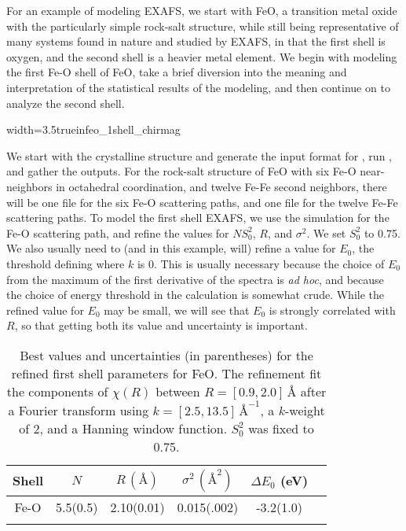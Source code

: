 For an example of modeling EXAFS, we start with FeO, a transition metal
oxide with the particularly simple rock-salt structure, while still being
representative of many systems found in nature and studied by EXAFS, in
that the first shell is oxygen, and the second shell is a heavier metal
element.  We begin with modeling the first Fe-O shell of FeO, take a brief
diversion into  the meaning and interpretation of the statistical results
of the modeling, and then continue on to analyze the second shell.

\begin{Nfig}{width=3.5truein}{feo_1shell_chirmag}
  \caption{First shell fit to the EXAFS of FeO, showing the magnitude of
    the Fourier transform of the EXAFS,  $|\chi(R)|$, for data (blue) and
    best fit model (red).}
  \label{Fig:FIT:feo1a}
\end{Nfig}

We start with the crystalline structure and generate the input format for
{\feff}, run {\feff}, and gather the outputs.  For the rock-salt structure
of FeO with six Fe-O near-neighbors in octahedral coordination, and twelve
Fe-Fe second neighbors, there will be one file for the six Fe-O scattering
paths, and one file for the twelve Fe-Fe scattering paths.  To model the
first shell EXAFS, we use the simulation for the Fe-O scattering path, and
refine the values for $NS_0^2$, $R$, and $\sigma^2$.  We set $S_0^2$ to
0.75.  We also usually need to (and in this example, will) refine a value
for $E_0$, the threshold defining where $k$ is 0.  This is usually
necessary because the choice of $E_0$ from the maximum of the first
derivative of the spectra is {\emph{ad hoc}}, and because the choice of
energy threshold in the calculation is somewhat crude.  While the refined
value for $E_0$ may be small, we will see that $E_0$ is strongly correlated
with $R$, so that getting both its value and uncertainty is important.

\begin{table}[tbh]
  \caption{Best values and uncertainties (in parentheses) for the
    refined first shell parameters for FeO.  The refinement fit the
    components of $\chi(R)$ between $R=[0.9, 2.0]\,\text{\AA}$ after a Fourier
    transform using $k=[2.5, 13.5]\,\text{\AA}^{-1}$, a $k$-weight of 2, and a
    Hanning window function.  $S_0^2$ was fixed to 0.75.}
  \label{TABLE:FIT:feo1}
  \begin{center}
    \begin{tabular}{cccccc}
    Shell & ${N}$ & ${R}\, (\text{\AA})$ & ${\sigma^2}\, ({\text{\AA}^2})$ & ${\Delta E_0}$ (eV) \\
    \hline    \noalign{\smallskip}
    Fe-O  &  5.5(0.5) & 2.10(0.01) & 0.015(.002) & -3.2(1.0) \\
    \noalign{\smallskip}
    \hline
  \end{tabular}
\end{center}
\end{table}

